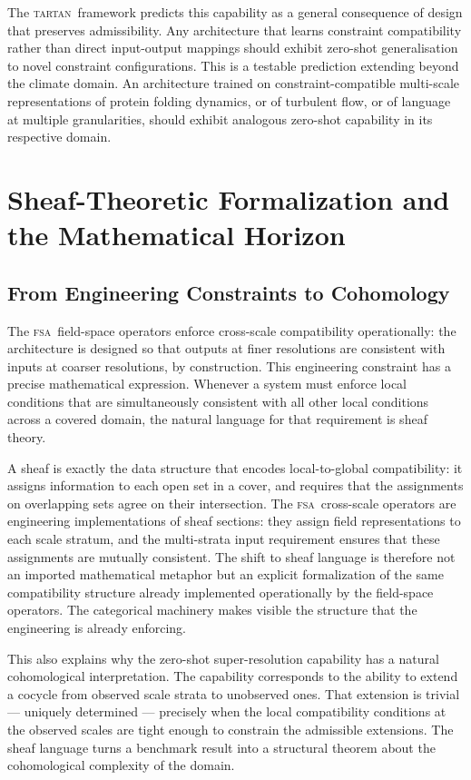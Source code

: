 \documentclass[11pt,a4paper]{article}
\theoremstyle{plain}
\theoremstyle{definition}
\theoremstyle{remark}
\newcommand{\TARTAN}{\textup{\textsc{tartan}}}
\newcommand{\FSA}{\textup{\textsc{fsa}}}
\begin{document}
The \TARTAN\ framework predicts this capability as a general consequence
of design that preserves admissibility. Any architecture that learns
constraint compatibility rather than direct input-output mappings should
exhibit zero-shot generalisation to novel constraint configurations. This
is a testable prediction extending beyond the climate domain. An architecture
trained on constraint-compatible multi-scale representations of protein
folding dynamics, or of turbulent flow, or of language at multiple
granularities, should exhibit analogous zero-shot capability in its
respective domain.

\section{Sheaf-Theoretic Formalization and the Mathematical Horizon}
\label{sec:sheaf}

\subsection{From Engineering Constraints to Cohomology}

The \FSA\ field-space operators enforce cross-scale compatibility
operationally: the architecture is designed so that outputs at finer
resolutions are consistent with inputs at coarser resolutions, by
construction. This engineering constraint has a precise mathematical
expression. Whenever a system must enforce local conditions that are
simultaneously consistent with all other local conditions across a covered
domain, the natural language for that requirement is sheaf theory.

A sheaf is exactly the data structure that encodes local-to-global
compatibility: it assigns information to each open set in a cover, and
requires that the assignments on overlapping sets agree on their
intersection. The \FSA\ cross-scale operators are engineering implementations
of sheaf sections: they assign field representations to each scale stratum,
and the multi-strata input requirement ensures that these assignments are
mutually consistent. The shift to sheaf language is therefore not an
imported mathematical metaphor but an explicit formalization of the same
compatibility structure already implemented operationally by the field-space
operators. The categorical machinery makes visible the structure that the
engineering is already enforcing.

This also explains why the zero-shot super-resolution capability has a
natural cohomological interpretation. The capability corresponds to the
ability to extend a cocycle from observed scale strata to unobserved ones.
That extension is trivial --- uniquely determined --- precisely when the
local compatibility conditions at the observed scales are tight enough to
constrain the admissible extensions. The sheaf language turns a benchmark
result into a structural theorem about the cohomological complexity of the
domain.
\end{document}
